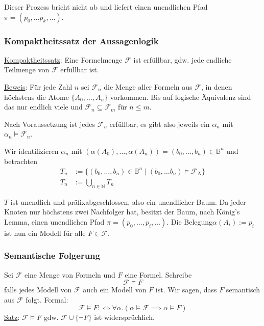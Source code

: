 \documentclass{scrartcl}
\begin{document}
Dieser Prozess bricht nicht ab und liefert einen unendlichen Pfad $\pi = (p_0, \ldots p_k, \ldots)$.

\subsubsection{Kompaktheitssatz der Aussagenlogik}

\underline{Kompaktheitssatz}: Eine Formelmenge $\mathcal{F}$ ist erfüllbar, gdw. jede endliche Teilmenge von $\mathcal{F}$ erfüllbar ist.

\underline{Beweis}: Für jede Zahl $n$ sei $\mathcal{F}_n$ die Menge aller Formeln aus $\mathcal{F}$, in denen höchstens die Atome $\{A_0, \ldots, A_n\}$ vorkommen. Bis auf logische Äquivalenz sind das nur endlich viele und $\mathcal{F}_n \subseteq \mathcal{F}_m$ für $n \leq m$.

Nach Voraussetzung ist jedes $\mathcal{F}_n$ erfüllbar, es gibt also jeweils ein $\alpha_n$ mit $\alpha_n \models \mathcal{F}_n$.

Wir identifizieren $\alpha_n$ mit $(\alpha(A_0), \ldots, \alpha(A_n)) = (b_0, \ldots, b_n) \in \mathbb{B}^n$ und betrachten
\begin{equation}
	\begin{split}
		T_n &:= \{(b_0, \ldots, b_n) \in \mathbb{B}^n \mid (b_0, \ldots b_n) \models \mathcal{F}_N\} \\
		T_n &:= \bigcup_{n \in \mathbb{N}} T_n
	\end{split}
\end{equation}

$T$ ist unendlich und präfixabgeschlossen, also ein unendlicher Baum. Da jeder Knoten nur höchstens zwei Nachfolger hat, besitzt der Baum, nach König's Lemma, einen unendlichen Pfad $\pi = (p_0, \ldots, p_i, \ldots)$. Die Belegung$\alpha(A_i) := p_i$ ist nun ein Modell für alle $F \in \mathcal{F}$.

\subsubsection{Semantische Folgerung}

Sei $\mathcal{F}$ eine Menge von Formeln und $F$ eine Formel. Schreibe
\begin{equation}
	\mathcal{F} \models F
\end{equation}
falls jedes Modell von $\mathcal{F}$ auch ein Modell von  $F$ ist. Wir sagen, dass $F$ semantisch aus $\mathcal{F}$ folgt. Formal:
\begin{equation}
	\mathcal{F} \models F :\iff \forall \alpha.(\alpha \models \mathcal{F} \implies \alpha \models F)
\end{equation}
\underline{Satz}: $\mathcal{F} \models F$ gdw. $\mathcal{F} \cup \{\neg F\}$ ist widersprüchlich.
\end{document}
